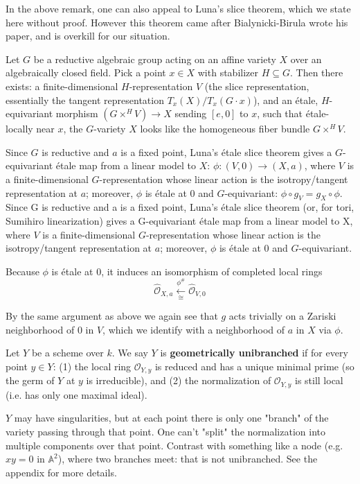 \documentclass[12pt]{article}
\begin{document}
\begin{remark}
    In the above remark, one can also appeal to Luna's slice theorem, which we state here without proof. However this theorem came after Bialynicki-Birula wrote his paper, and is overkill for our situation.
    \begin{adjustwidth}{2em}{0pt}
\vspace{-\parskip}
\vspace{-16pt}
\begin{theorem}
    Let $G$ be a reductive algebraic group acting on an affine variety $X$ over an algebraically closed field. Pick a point $x \in X$ with stabilizer $H \subseteq G$. Then there exists: a finite-dimensional $H$-representation $V$ (the slice representation, essentially the tangent representation $T_x(X)/T_x(G\cdot x)$), and an étale, $H$-equivariant morphism $(G \times^H V) \longrightarrow X$ sending $[e,0]$ to $x$, such that étale-locally near $x$, the $G$-variety $X$ looks like the homogeneous fiber bundle $G \times^H V$.
\end{theorem}
\end{adjustwidth}
Since $G$ is reductive and $a$ is a fixed point, Luna's étale slice theorem gives a $G$-equivariant étale map from a linear model to $X$: $\phi:(V,0)\longrightarrow (X,a)$, where $V$ is a finite-dimensional $G$-representation whose linear action is the isotropy/tangent representation at $a$; moreover, $\phi$ is étale at $0$ and $G$-equivariant: $\phi\circ g_V = g_X\circ \phi$.
Since G is reductive and a is a fixed point, Luna’s étale slice theorem (or, for tori, Sumihiro linearization) gives a G-equivariant étale map from a linear model to X, where $V$ is a finite-dimensional $G$-representation whose linear action is the isotropy/tangent representation at $a$; moreover, $\phi$ is étale at $0$ and $G$-equivariant.

Because $\phi$ is étale at $0$, it induces an isomorphism of completed local rings \[\widehat{\mathcal O}_{X,a}\xleftarrow[\cong]{\phi^\#} \widehat{\mathcal O}_{V,0}\] 

By the same argument as above we again see that $g$ acts trivially on a Zariski neighborhood of $0$ in $V$, which we identify with a neighborhood of $a$ in $X$ via $\phi$.
\end{remark}

\begin{definition}
    Let $Y$ be a scheme over $k$. We say $Y$ is \textbf{geometrically unibranched} if for every point $y \in Y$: (1) the local ring $\mathcal{O}_{Y,y}$ is reduced and has a unique minimal prime (so the germ of $Y$ at $y$ is irreducible), and (2) the normalization of $\mathcal{O}_{Y,y}$ is still local (i.e. has only one maximal ideal).
\end{definition}
$Y$ may have singularities, but at each point there is only one "branch" of the variety passing through that point. One can't "split" the normalization into multiple components over that point. Contrast with something like a node (e.g. $xy=0$ in $\mathbb{A}^2$), where two branches meet: that is not unibranched. See the appendix for more details.
\end{document}
